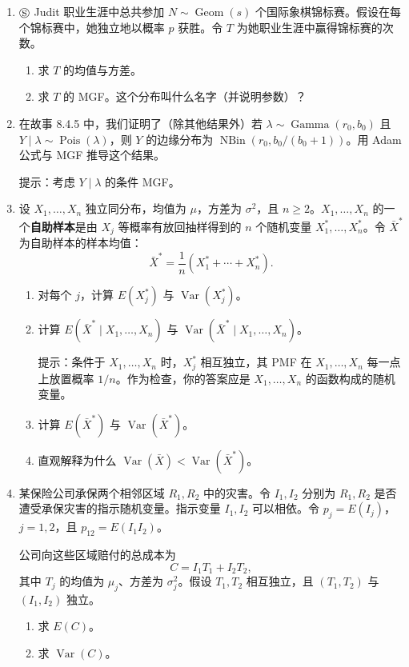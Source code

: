\documentclass[UTF8,12pt,a4paper,fontset=fandol]{ctexart}
\begin{document}
\begin{enumerate}
  \item $\circledS$ Judit 职业生涯中总共参加 $N\sim\operatorname{Geom}(s)$ 个国际象棋锦标赛。假设在每个锦标赛中，她独立地以概率 $p$ 获胜。令 $T$ 为她职业生涯中赢得锦标赛的次数。
  \begin{enumerate}
    \item[(a)] 求 $T$ 的均值与方差。
    \item[(b)] 求 $T$ 的 MGF。这个分布叫什么名字（并说明参数）？
  \end{enumerate}

  \item 在故事 8.4.5 中，我们证明了（除其他结果外）若 $\lambda\sim\operatorname{Gamma}(r_0,b_0)$ 且 $Y\mid\lambda\sim\operatorname{Pois}(\lambda)$，则 $Y$ 的边缘分布为 $\operatorname{NBin}(r_0,b_0/(b_0+1))$。用 Adam 公式与 MGF 推导这个结果。

  \noindent 提示：考虑 $Y\mid\lambda$ 的条件 MGF。

  \item 设 $X_1,\ldots,X_n$ 独立同分布，均值为 $\mu$，方差为 $\sigma^2$，且 $n\ge2$。$X_1,\ldots,X_n$ 的一个\textbf{自助样本}是由 $X_j$ 等概率有放回抽样得到的 $n$ 个随机变量 $X_1^*,\ldots,X_n^*$。令 $\bar X^*$ 为自助样本的样本均值：
  \[
    \bar X^*=\frac1n(X_1^*+\cdots+X_n^*).
  \]
  \begin{enumerate}
    \item[(a)] 对每个 $j$，计算 $E(X_j^*)$ 与 $\operatorname{Var}(X_j^*)$。
    \item[(b)] 计算 $E(\bar X^*\mid X_1,\ldots,X_n)$ 与 $\operatorname{Var}(\bar X^*\mid X_1,\ldots,X_n)$。

    \noindent 提示：条件于 $X_1,\ldots,X_n$ 时，$X_j^*$ 相互独立，其 PMF 在 $X_1,\ldots,X_n$ 每一点上放置概率 $1/n$。作为检查，你的答案应是 $X_1,\ldots,X_n$ 的函数构成的随机变量。

    \item[(c)] 计算 $E(\bar X^*)$ 与 $\operatorname{Var}(\bar X^*)$。
    \item[(d)] 直观解释为什么 $\operatorname{Var}(\bar X)<\operatorname{Var}(\bar X^*)$。
  \end{enumerate}

  \item 某保险公司承保两个相邻区域 $R_1,R_2$ 中的灾害。令 $I_1,I_2$ 分别为 $R_1,R_2$ 是否遭受承保灾害的指示随机变量。指示变量 $I_1,I_2$ 可以相依。令 $p_j=E(I_j)$，$j=1,2$，且 $p_{12}=E(I_1I_2)$。

  公司向这些区域赔付的总成本为
  \[
    C=I_1T_1+I_2T_2,
  \]
  其中 $T_j$ 的均值为 $\mu_j$、方差为 $\sigma_j^2$。假设 $T_1,T_2$ 相互独立，且 $(T_1,T_2)$ 与 $(I_1,I_2)$ 独立。
  \begin{enumerate}
    \item[(a)] 求 $E(C)$。
    \item[(b)] 求 $\operatorname{Var}(C)$。
  \end{enumerate}


\end{enumerate}
\end{document}
